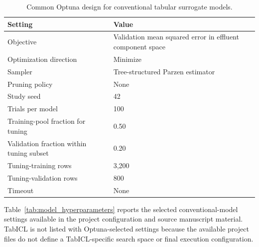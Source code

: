 \documentclass[a4paper,fleqn]{cas-sc}
\begin{document}
\begin{table}[htbp]
\centering
\caption{Common Optuna design for conventional tabular surrogate models.}
\label{tab:optuna_design}
\scriptsize
\begin{tabular}{ll}
\hline
Setting & Value \\
\hline
Objective & Validation mean squared error in effluent component space \\
Optimization direction & Minimize \\
Sampler & Tree-structured Parzen estimator \\
Pruning policy & None \\
Study seed & 42 \\
Trials per model & 100 \\
Training-pool fraction for tuning & 0.50 \\
Validation fraction within tuning subset & 0.20 \\
Tuning-training rows & 3,200 \\
Tuning-validation rows & 800 \\
Timeout & None \\
\hline
\end{tabular}
\end{table}

Table~\ref{tab:model_hyperparameters} reports the selected conventional-model settings available in the project configuration and source manuscript material. TabICL is not listed with Optuna-selected settings because the available project files do not define a TabICL-specific search space or final execution configuration.
\end{document}
